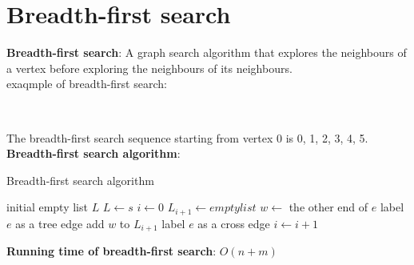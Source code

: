 \documentclass[onecolumn]{report}
\begin{document}
\section{Breadth-first search}
\textbf{Breadth-first search}: A graph search algorithm that explores the neighbours of a vertex before exploring the neighbours of its neighbours.\\
exaqmple of breadth-first search:\\
\begin{center}
    \\
\end{center}
The breadth-first search sequence starting from vertex 0 is 0, 1, 2, 3, 4, 5.\\
\textbf{Breadth-first search algorithm}:\\
\begin{algorithm}[H]
\caption{Breadth-first search algorithm}
\begin{algorithmic}[1]
\State initial empty list $L$
\State $L \gets {s}$
\State $i \gets 0$
\State $L_{i+1} \gets empty list$
\State $w \gets$ the other end of $e$
\State label $e$ as a tree edge
\State add $w$ to $L_{i+1}$
\Else
\State label $e$ as a cross edge
\EndIf
\EndIf
\EndFor
\EndFor
\State $i \gets i+1$
\EndWhile
\EndProcedure
\end{algorithmic}
\end{algorithm}
\textbf{Running time of breadth-first search}: $O(n+m)$\\
\end{document}
